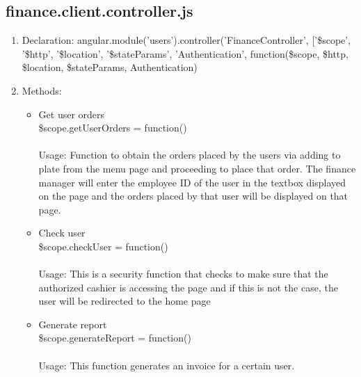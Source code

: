 \documentclass[a4paper,12pt]{report}
\begin{document}
\subsection{finance.client.controller.js}
\begin{enumerate}
\item Declaration: angular.module('users').controller('FinanceController', ['\$scope', '\$http', '\$location', '\$stateParams', 'Authentication',
    function(\$scope, \$http, \$location, \$stateParams, Authentication)  
\item Methods:
	\begin{itemize}
		\item  Get user orders \\  \$scope.getUserOrders = function() 
		\\ \\ Usage: Function to obtain the orders placed by the users via adding to plate from the menu page and proceeding to place that order. The finance manager will enter the employee ID of the user in the textbox displayed on the page and the orders placed by that user will be displayed on that page.
		\item Check user \\ \$scope.checkUser = function() 
	\\ \\ Usage: This is a security function that checks to make sure that the authorized cashier is accessing the page and if this is not the case, the user will be redirected to the home page
	\item Generate report\\
	\$scope.generateReport = function()
	\\ \\Usage: This function generates an invoice for a certain user.
	\end{itemize}	
\end{enumerate}
\end{document}
